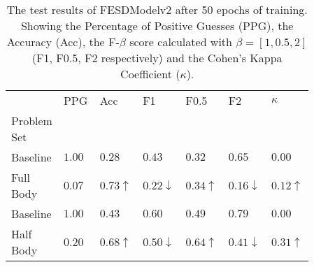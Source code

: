     \begin{table}[!htbp]
        \caption[Test Results of FESDModelv2]{The test results of FESDModelv2 after 50 epochs of training. Showing the Percentage of Positive Guesses (PPG), the Accuracy (Acc), the F-$\beta$ score calculated with $\beta = [1, 0.5, 2]$ (F1, F0.5, F2 respectively) and the Cohen's Kappa Coefficient ($\kappa$).}
        \label{tab:res_v2}
        \begin{tabular}{p{0.14\linewidth}p{0.12\linewidth}p{0.12\linewidth}p{0.12\linewidth}p{0.12\linewidth}p{0.12\linewidth}p{0.12\linewidth}}
\hline
{} &    PPG &  Acc &   F1 &  F0.5 &   F2 &  $\kappa$ \\
Problem Set   &        &      &      &       &      &           \\
\hline
\hline
Baseline    & $1.00$ &	$0.28$ &	        $0.43$ &	        $0.32$ &	        $0.65$ &	        $0.00$ \\
Full Body   & $0.07$ &	$0.73\uparrow$ &	$0.22\downarrow$ &	$0.34\uparrow$ &	$0.16\downarrow$ &	$0.12\uparrow$ \\
\hline
Baseline    & $1.00$ &	$0.43$ &	        $0.60$ &	        $0.49$ & 	        $0.79$ &	        $0.00$ \\
Half Body   & $0.20$ &	$0.68\uparrow$ &	$0.50\downarrow$ &	$0.64\uparrow$ &	$0.41\downarrow$ &	$0.31\uparrow$ \\
\hline
\end{tabular}

    \end{table}
